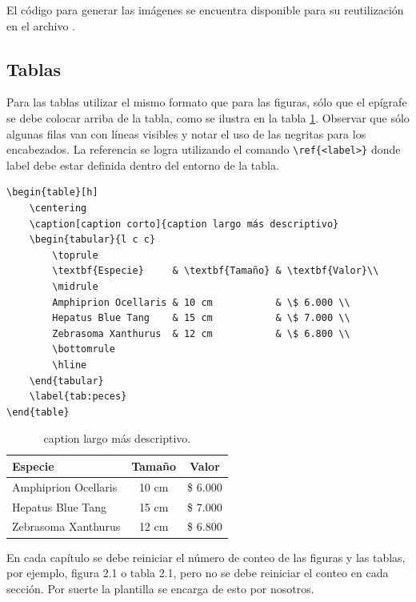 El código para generar las imágenes se encuentra disponible para su reutilización en el archivo .

\subsection{Tablas}

Para las tablas utilizar el mismo formato que para las figuras, sólo que el epígrafe se debe colocar arriba de la tabla, como se ilustra en la tabla \ref{tab:peces}. Observar que sólo algunas filas van con líneas visibles y notar el uso de las negritas para los encabezados.  La referencia se logra utilizando el comando \verb|\ref{<label>}| donde label debe estar definida dentro del entorno de la tabla.

\begin{verbatim}
\begin{table}[h]
	\centering
	\caption[caption corto]{caption largo más descriptivo}
	\begin{tabular}{l c c}    
		\toprule
		\textbf{Especie}     & \textbf{Tamaño} & \textbf{Valor}\\
		\midrule
		Amphiprion Ocellaris & 10 cm           & \$ 6.000 \\		
		Hepatus Blue Tang    & 15 cm           & \$ 7.000 \\
		Zebrasoma Xanthurus  & 12 cm           & \$ 6.800 \\
		\bottomrule
		\hline
	\end{tabular}
	\label{tab:peces}
\end{table}
\end{verbatim}


\begin{table}[h]
	\centering
	\caption[caption corto]{caption largo más descriptivo.}
	\begin{tabular}{l c c}    
		\toprule
		\textbf{Especie} 	 & \textbf{Tamaño} 		& \textbf{Valor}  \\
		\midrule
		Amphiprion Ocellaris & 10 cm 				& \$ 6.000 \\		
		Hepatus Blue Tang	 & 15 cm				& \$ 7.000 \\
		Zebrasoma Xanthurus	 & 12 cm				& \$ 6.800 \\
		\bottomrule
		\hline
	\end{tabular}
	\label{tab:peces}
\end{table}

En cada capítulo se debe reiniciar el número de conteo de las figuras y las tablas, por ejemplo, figura 2.1 o tabla 2.1, pero no se debe reiniciar el conteo en cada sección. Por suerte la plantilla se encarga de esto por nosotros.

